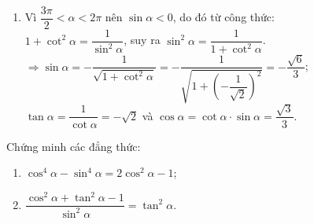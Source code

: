 \begin{bt}
\begin{bt}
{\begin{enumerate}
			      $\Rightarrow\cos\alpha=-\dfrac{1}{\sqrt{1+\tan^2\alpha}}=-\dfrac{1}{\sqrt{1+(\sqrt{5})^2}}=-\dfrac{\sqrt{6}}{6}$;\\ $\cot\alpha=\dfrac{1}{\tan\alpha}=\dfrac{\sqrt{5}}{5}$ và $\sin\alpha=\tan\alpha\cdot\cos\alpha=-\dfrac{\sqrt{30}}{6}$.
			\item
			      Vì $\dfrac{3\pi}{2}<\alpha<2\pi$ nên $\sin\alpha<0$, do đó từ công thức:\\
			      $1+\cot^2\alpha=\dfrac{1}{\sin^2\alpha}$, suy ra $\sin^2\alpha=\dfrac{1}{1+\cot^2\alpha}$.\\
			      $\Rightarrow\sin\alpha=-\dfrac{1}{\sqrt{1+\cot^2\alpha}}=-\dfrac{1}{\sqrt{1+\left(-\dfrac{1}{\sqrt{2}}\right)^2}}=-\dfrac{\sqrt{6}}{3}$;\\ $\tan\alpha=\dfrac{1}{\cot\alpha}=-\sqrt{2}$ và $\cos\alpha=\cot\alpha\cdot\sin\alpha=\dfrac{\sqrt{3}}{3}$.
		\end{enumerate}
	}
\end{bt}

\begin{bt}%
	Chứng minh các đẳng thức:
	\begin{enumerate}
		\item $\cos^4\alpha-\sin^4\alpha=2\cos^2\alpha-1$;
		\item $\dfrac{\cos^2\alpha+\tan^2\alpha-1}{\sin^2\alpha}=\tan^2\alpha$.
	\end{enumerate}
\end{bt}


\end{bt}
